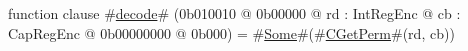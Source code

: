 function clause #\hyperref[zdecode]{decode}# (0b010010 @ 0b00000 @ rd : IntRegEnc @ cb : CapRegEnc @ 0b00000000 @ 0b000) = #\hyperref[zSome]{Some}#(#\hyperref[zCGetPerm]{CGetPerm}#(rd, cb))
